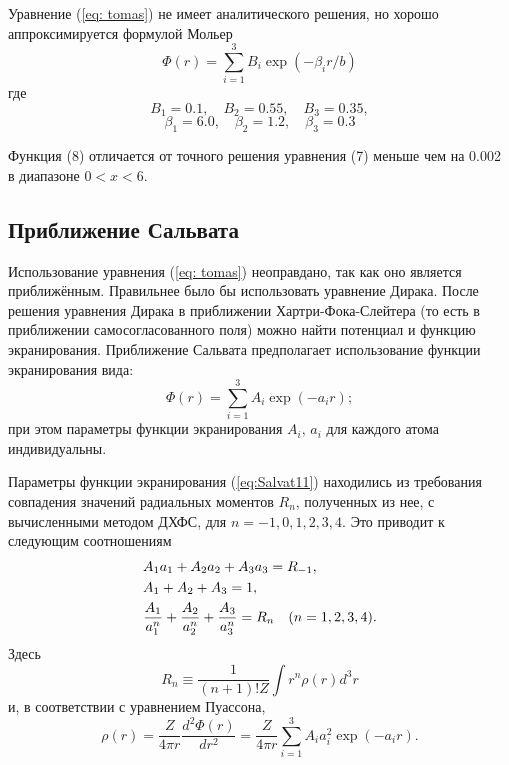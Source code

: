 \documentclass[a4paper,14pt]{extarticle} %
\begin{document}
Уравнение (\ref{eq: tomas}) не имеет аналитического 
решения, но хорошо аппроксимируется формулой Мольер
\begin{equation}
\Phi(r)=\sum_{i=1}^3B_i\exp(-\beta_ir/b)
\label{eq:a8}
\end{equation}
где
$$B_1=0.1,\quad B_2=0.55,\quad B_3=0.35, $$
$$\beta_1=6.0,\quad \beta_2=1.2,\quad \beta_3=0.3$$
 
Функция (8) отличается от точного решения уравнения (7) меньше чем на 
0.002 в диапазоне $0<x<6$.

\subsection{Приближение Сальвата}

Использование уравнения (\ref{eq: tomas}) неоправдано, так как оно является приближённым. Правильнее было бы использовать уравнение Дирака. После решения уравнения Дирака в приближении Хартри-Фока-Слейтера (то есть в приближении самосогласованного поля) можно найти потенциал и функцию экранирования. Приближение Сальвата предполагает использование функции экранирования вида:
\begin{equation}
{\Phi}(r) = \sum\limits_{i = 1}^3 {{A_i}\exp ( - {a_i}r)};
\label{eq:Salvat11}
\end{equation}
при этом параметры функции экранирования $A_i,\, a_i$ для каждого атома индивидуальны. 

Параметры функции экранирования (\ref{eq:Salvat11}) находились из требования совпадения значений радиальных моментов $R_n$, полученных из нее, с вычисленными методом ДХФС, для $n = - 1, 0, 1, 2, 3, 4 $. Это приводит к следующим соотношениям
\begin{equation}
\begin{gathered}
  A_1 a_1 + A_2 a_2 + A_3 a_3 = R_{-1}, \hfill \\
  A_1 + A_2 + A_3 = 1, \hfill \\
  \frac{A_1}{a_1^n} + \frac{A_2}{a_2^n} + \frac{A_3}{a_3^n} = R_n\quad (n = 1,2,3,4). \hfill \\
\end{gathered}
\label{eq:Salvat15}
\end{equation}
Здесь
\[
R_n \equiv \frac{1}{{(n + 1)!Z}}\int {{r^n}\rho (r){d^3}r}
\label{eq:Salvat13}
\]
и, в соответствии с уравнением Пуассона,
\begin{equation}
\rho (r) = \frac{Z}{4\pi r}\frac{d^2 \Phi(r)}{d r^2}
= \frac{Z}{4\pi r}\sum\limits_{i = 1}^3 {{A_i}a_i^2\exp ( - {a_i}r)} .
\label{eq:rhoPoisson}
\end{equation}
\end{document}
